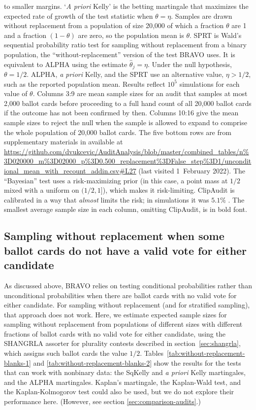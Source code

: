 \documentclass[12pt,runningheads]{llncs}
\begin{document}
{\begin{table}
{to smaller margins.
`\emph{A priori} Kelly' is the betting martingale that maximizes the expected rate of growth of the test statistic when $\theta = \eta$.
Samples are drawn without replacement from a population of size 20,000 of which a fraction $\theta$ are 1 and a fraction $(1-\theta)$
are zero, so the population mean is $\theta$.
SPRT is Wald's sequential probability ratio test for sampling without replacement from a binary population, the ``without-replacement''
version of the test BRAVO uses.
It is equivalent to ALPHA using the estimate $\hat{\theta}_j = \eta$.
Under the null hypothesis, $\theta=1/2$. 
ALPHA, \emph{a priori} Kelly, and the SPRT use an alternative value, $\eta > 1/2$, such as the reported population mean. 
Results reflect $10^5$ simulations for each value of $\theta$.
Columns 3:9 are mean sample sizes for an audit that samples at most 2,000 ballot cards before proceeding to
a full hand count of all 20,000 ballot cards if the outcome has not been confirmed by then. 
Columns 10:16 give the mean sample sizes to reject the null when the sample is allowed to
expand to comprise the whole population of 20,000 ballot cards.
The five bottom rows are from supplementary materials in \cite{huangEtal20} available at 
\url{https://github.com/dvukcevic/AuditAnalysis/blob/master/combined_tables/n\%3D020000_m\%3D02000_p\%3D0.500_replacement\%3DFalse_step\%3D1/unconditional_mean_with_recount_addin.csv\#L27} (last visited 1~February 2022).
The ``Bayesian'' test uses a risk-maximizing prior \cite{vora19} (in this case, a point mass at $1/2$ mixed with a uniform on $(1/2, 1]$), which makes it risk-limiting.
ClipAudit \cite{rivest17} is calibrated in a way that \emph{almost} limits the risk; in simulations it was $5.1\%$ \cite{huangEtal20}.
The smallest average sample size in each column, omitting ClipAudit, is in bold font.
}
\end{table}

\subsection{Sampling without replacement when some ballot cards do not have a valid vote for either candidate} \label{sec:blanks}

As discussed above, BRAVO relies on testing conditional probabilities
rather than unconditional probabilities when there are ballot cards with no valid vote for either candidate.
For sampling without replacement (and for stratified sampling), that approach does not work.
Here, we estimate expected sample sizes for sampling without replacement from populations of different sizes
with different fractions of ballot cards with no valid vote for either candidate, using the SHANGRLA assorter for plurality
contests described in section~\ref{sec:shangrla}, which assigns such ballot cards the value $1/2$.
Tables~\ref{tab:without-replacement-blanks-1} and \ref{tab:without-replacement-blanks-2} show the
 results for the tests that can work with nonbinary data:
the SqKelly and \emph{a priori} Kelly martingales, and the ALPHA martingales. 
Kaplan's martingale, the Kaplan-Wald test, and the Kaplan-Kolmogorov test \cite{stark09b,stark20} could also be used, but we do not explore their performance here.
(However, see section \ref{sec:comparison-audits}.)

}
\end{document}
